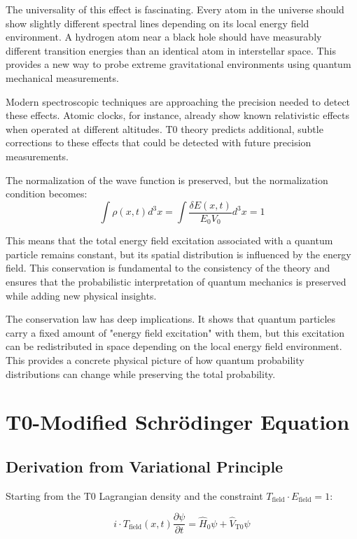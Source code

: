 \documentclass[12pt,a4paper]{article}
\newcommand{\deltaE}{\delta E}
\theoremstyle{definition}
\theoremstyle{remark}
\begin{document}
The universality of this effect is fascinating. Every atom in the universe should show slightly different spectral lines depending on its local energy field environment. A hydrogen atom near a black hole should have measurably different transition energies than an identical atom in interstellar space. This provides a new way to probe extreme gravitational environments using quantum mechanical measurements.

Modern spectroscopic techniques are approaching the precision needed to detect these effects. Atomic clocks, for instance, already show known relativistic effects when operated at different altitudes. T0 theory predicts additional, subtle corrections to these effects that could be detected with future precision measurements.

The normalization of the wave function is preserved, but the normalization condition becomes:
$$\int \rho(x,t) d^3x = \int \frac{\deltaE(x,t)}{E_0 V_0} d^3x = 1$$

This means that the total energy field excitation associated with a quantum particle remains constant, but its spatial distribution is influenced by the energy field. This conservation is fundamental to the consistency of the theory and ensures that the probabilistic interpretation of quantum mechanics is preserved while adding new physical insights.

The conservation law has deep implications. It shows that quantum particles carry a fixed amount of "energy field excitation" with them, but this excitation can be redistributed in space depending on the local energy field environment. This provides a concrete physical picture of how quantum probability distributions can change while preserving the total probability.

\section{T0-Modified Schrödinger Equation}

\subsection{Derivation from Variational Principle}

Starting from the T0 Lagrangian density and the constraint $T_{\text{field}} \cdot E_{\text{field}} = 1$:

\begin{equation}
	\boxed{i \cdot T_{\text{field}}(x,t) \frac{\partial\psi}{\partial t} = \hat{H}_0 \psi + \hat{V}_{\text{T0}} \psi}
	\label{eq:t0_schrodinger_general}
\end{equation}
\end{document}

